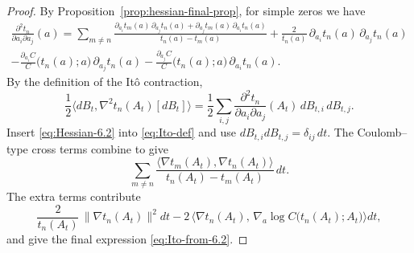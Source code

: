 \documentclass[12pt,reqno]{amsart}
\theoremstyle{plain}
\theoremstyle{definition}
\theoremstyle{remark}
\begin{document}
\begin{proof}
By Proposition~\ref{prop:hessian-final-prop}, for simple zeros we have
\begin{multline}\label{eq:Hessian-6.2}
\frac{\partial^2 t_n}{\partial a_i\partial a_j}(a)
=\sum_{m\neq n}
\frac{\partial_{a_i}t_m(a)\,\partial_{a_j}t_n(a)+\partial_{a_j}t_m(a)\,\partial_{a_i}t_n(a)}
     {\,t_n(a)-t_m(a)\,}
+ \frac{2}{t_n(a)}\,\partial_{a_i}t_n(a)\,\partial_{a_j}t_n(a) \\
-\frac{\partial_{a_i}C}{C}\!\bigl(t_n(a);a\bigr)\,\partial_{a_j}t_n(a)
-\frac{\partial_{a_j}C}{C}\!\bigl(t_n(a);a\bigr)\,\partial_{a_i}t_n(a).
\end{multline}
By the definition of the Itô contraction,
\begin{equation}\label{eq:Ito-def}
\frac12\big\langle dB_t,\nabla^2 t_n(A_t)[dB_t]\big\rangle
=\frac12\sum_{i,j}\frac{\partial^2 t_n}{\partial a_i\partial a_j}(A_t)\,dB_{t,i}\,dB_{t,j}.
\end{equation}
Insert \eqref{eq:Hessian-6.2} into \eqref{eq:Ito-def} and use $dB_{t,i}dB_{t,j}=\delta_{ij}\,dt$.
The Coulomb–type cross terms combine to give
\begin{equation}
\sum_{m\ne n}\frac{\langle \nabla t_m(A_t),\nabla t_n(A_t)\rangle}{t_n(A_t)-t_m(A_t)}\,dt.
\end{equation}
The extra terms contribute
\begin{equation}
\frac{2}{t_n(A_t)}\,\|\nabla t_n(A_t)\|^2 dt
-2\,\Big\langle \nabla t_n(A_t),\,\nabla_a \log C\!\bigl(t_n(A_t);A_t\bigr)\Big\rangle dt,
\end{equation}
and give the final expression
\eqref{eq:Ito-from-6.2}.
\end{proof}
\end{document}
